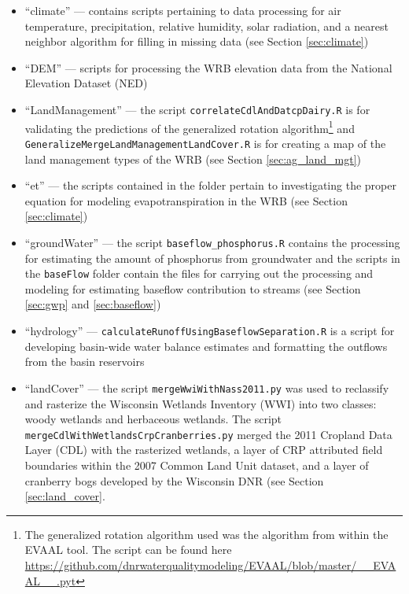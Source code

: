 \begin{itemize}
\item ``climate'' --- contains scripts pertaining to data processing for air temperature, precipitation, relative humidity, solar radiation, and a nearest neighbor algorithm for filling in missing data (see Section \ref{sec:climate})

\item ``DEM'' --- scripts for processing the WRB elevation data from the National Elevation Dataset (NED)

\item ``LandManagement'' --- the script \texttt{correlateCdlAndDatcpDairy.R} is for validating the predictions of the generalized rotation algorithm\footnote{The generalized rotation algorithm used was the algorithm from within the EVAAL tool. The script can be found here \url{https://github.com/dnrwaterqualitymodeling/EVAAL/blob/master/__EVAAL__.pyt}} and \texttt{GeneralizeMergeLandManagementLandCover.R} is for creating a map of the land management types of the WRB (see Section \ref{sec:ag_land_mgt})

\item ``et'' --- the scripts contained in the folder pertain to investigating the proper equation for modeling evapotranspiration in the WRB (see Section \ref{sec:climate})

\item ``groundWater'' --- the script \texttt{baseflow\_phosphorus.R} contains the processing for estimating the amount of phosphorus from groundwater and the scripts in the \texttt{baseFlow} folder contain the files for carrying out the processing and modeling for estimating baseflow contribution to streams (see Section \ref{sec:gwp} and \ref{sec:baseflow})

\item ``hydrology'' --- \texttt{calculateRunoffUsingBaseflowSeparation.R} is a script for developing  basin-wide water balance estimates and formatting the outflows from the basin reservoirs

\item ``landCover'' --- the script \texttt{mergeWwiWithNass2011.py} was used to reclassify and rasterize the Wisconsin Wetlands Inventory (WWI) into two classes: woody wetlands and herbaceous wetlands. The script \texttt{mergeCdlWithWetlandsCrpCranberries.py} merged the 2011 Cropland Data Layer (CDL) with the rasterized wetlands, a layer of CRP attributed field boundaries within the 2007 Common Land Unit dataset, and a layer of cranberry bogs developed by the Wisconsin DNR (see Section \ref{sec:land_cover}.


\end{itemize}
